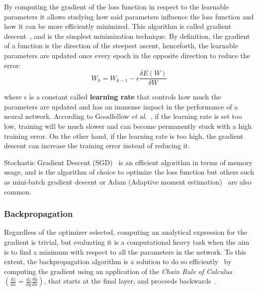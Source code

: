 \documentclass[class=report, crop=false, a4paper, 12pt]{standalone}
\begin{document}
\par By computing the gradient of the loss function in respect to the learnable parameters it allows studying how said parameters influence the loss function and how it can be more efficiently minimized. This algorithm is called gradient descent~\autocite{ruderOverviewGradientDescent}, and is the simplest minimization technique. By definition, the gradient of a function is the direction of the steepest ascent, henceforth, the learnable parameters are updated once every epoch in the opposite direction to reduce the error: 
\begin{equation}
    W_k = W_{k-1}-\epsilon\frac{\delta E(W)}{{\delta} W}
\end{equation}

\noindent where $\epsilon$ is a constant called \textbf{learning rate} that controls how much the parameters are updated and has an immense impact in the performance of a neural network. According to Goodfellow \textit{et al.}~\autocite{Goodfellow-et-al-2016}, if the learning rate is set too low, training will be much slower and can become permanently stuck with a high training error. On the other hand, if the learning rate is too high, the gradient descent can increase the training error instead of reducing it.
\par Stochastic Gradient Descent (SGD)~\autocite{alzubaidiReviewDeepLearning2021} is an efficient algorithm in terms of memory usage, and is the algorithm of choice to optimize the loss function but others such as mini-batch gradient descent or Adam (Adaptive moment estimation)~\autocite{kingmaAdamMethodStochastic2015} are also common.

\subsubsection{Backpropagation}
\par Regardless of the optimizer selected, computing an analytical expression for the gradient is trivial, but evaluating it is a computational heavy task when the aim is to find a minimum with respect to all the parameters in the network. To this extent, the backpropagation algorithm is a solution to do so efficiently~\autocite{6795724} by computing the gradient using an application of the \textit{Chain Rule of Calculus} $\left(\frac{dz}{dx} = \frac{dz}{dy}\frac{dy}{dx}\right)$, that starts at the final layer, and proceeds backwards~\autocite{Goodfellow-et-al-2016}. 

\label{transf learning}
\end{document}
